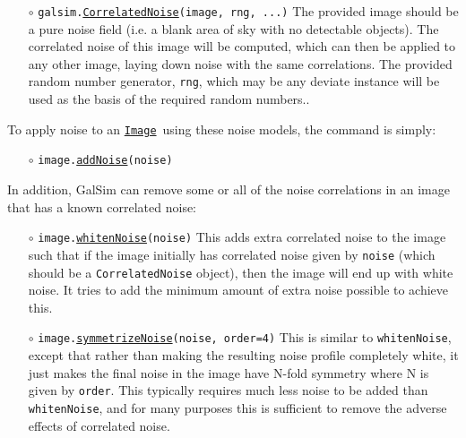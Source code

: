 \documentclass[preprint,10pt]{../../devel/modules/aastex}
\newcommand\Image{\href{http://galsim-developers.github.io/GalSim/classgalsim_1_1image_1_1_image.html}{\texttt{Image}}}
\begin{document}
\begin{itemize}
  \item[$\circ$] 
  \texttt{galsim.\href{http://galsim-developers.github.io/GalSim/classgalsim_1_1correlatednoise_1_1_correlated_noise.html}{CorrelatedNoise}(image, rng, ...)}  
    \newline
   The provided image should be a pure noise field (i.e. a blank area of sky with no detectable
    objects).  The correlated noise of this image will be computed, which can then be applied
    to any other image, laying down noise with the same correlations.  The provided
    random number generator, \texttt{rng}, which may be any deviate instance will be used
    as the basis of the required random numbers.. 
    
\end{itemize}

To apply noise to an \Image\ using these noise models,
the command is simply:

\begin{itemize}

\item[$\circ$] \texttt{image.\href{http://galsim-developers.github.io/GalSim/namespacegalsim_1_1noise.html\#aa45903c801b069774d5eafdbee54bda7}{addNoise}(noise)} 

\end{itemize}

In addition, GalSim can remove some or all of the noise correlations in an image that has 
a known correlated noise:

\begin{itemize}

  \item[$\circ$] 
  \texttt{image.\href{http://galsim-developers.github.io/GalSim/classgalsim_1_1correlatednoise_1_1___base_correlated_noise.html\#af39b3141a36a515022acabae5c973817}{whitenNoise}(noise)} 
    \newline 
    This adds extra correlated noise
    to the image such that if the image initially has correlated noise given by \texttt{noise}
    (which should be a \texttt{CorrelatedNoise} object), then the image will end up with
    white noise.  It tries to add the minimum amount of extra noise possible to achieve this.

  \item[$\circ$] 
  \texttt{image.\href{http://galsim-developers.github.io/GalSim/classgalsim_1_1correlatednoise_1_1___base_correlated_noise.html\#a8f4cb9995d9e097a35aaf87da1b72ec1}{symmetrizeNoise}(noise, order=4)} 
    \newline 
    This is similar to \texttt{whitenNoise}, 
    except that rather than making the resulting noise profile completely white, it just makes
    the final noise in the image have N-fold symmetry where N is given by \texttt{order}.
    This typically requires much less noise to be added than \texttt{whitenNoise}, and for
    many purposes this is sufficient to remove the adverse effects of correlated noise.
    
\end{itemize}
\end{document}
